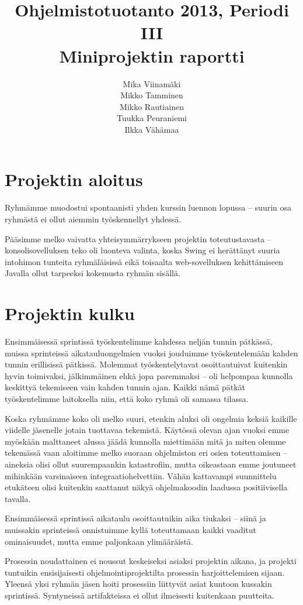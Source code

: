 \documentclass{article}
\title{Ohjelmistotuotanto 2013, Periodi III \\ Miniprojektin raportti}
\author{Mika Viinamäki \\ Mikko Tamminen \\ Mikko Rautiainen \\ Tuukka Peuraniemi \\ Ilkka Vähämaa}
\begin{document}
\begin{titlepage}
\maketitle
\end{titlepage}

\section{Projektin aloitus}
Ryhmämme muodostui spontaanisti yhden kurssin luennon lopussa -- suurin osa ryhmästä ei ollut aiemmin työskennellyt yhdessä.

Pääsimme melko vaivatta yhteisymmärrykseen projektin toteutustavasta -- konsolisovelluksen teko oli luonteva valinta, koska Swing ei herättänyt suuria intohimon tunteita ryhmäläisissä eikä toisaalta web-sovelluksen kehittämiseen Javalla ollut tarpeeksi kokemusta ryhmän sisällä.

\section{Projektin kulku}

Ensimmäisessä sprintissä työskentelimme kahdessa neljän tunnin pätkässä, muissa sprinteissä aikatauluongelmien vuoksi jouduimme työskentelemään kahden tunnin erillisissä pätkissä. Molemmat työskentelytavat osoittautuivat kuitenkin hyvin toimivaksi, jälkimmäinen ehkä jopa paremmaksi -- oli helpompaa kunnolla keskittyä tekemiseen vain kahden tunnin ajan. Kaikki nämä pätkät työskentelimme laitoksella niin, että koko ryhmä oli samassa tilassa.

Koska ryhmämme koko oli melko suuri, etenkin aluksi oli ongelmia keksiä kaikille viidelle jäsenelle jotain tuottavaa tekemistä. Käytössä olevan ajan vuoksi emme myöskään malttaneet alussa jäädä kunnolla miettimään mitä ja miten olemme tekemässä vaan aloitimme melko suoraan ohjelmiston eri osien toteuttamisen -- aineksia olisi ollut suurempaankin katastrofiin, mutta oikeastaan emme joutuneet mihinkään varsinaiseen integraatiohelvettiin. Vähän kattavampi suunnittelu etukäteen olisi kuitenkin saattanut näkyä ohjelmakoodin laadussa positiivisella tavalla.

Ensimmäisessä sprintissä aikataulu osoittautuikin aika tiukaksi -- siinä ja muissakin sprinteissä onnistuimme kyllä toteuttamaan kaikki vaaditut ominaisuudet, mutta emme paljonkaan ylimääräistä.

Prosessin noudattainen ei noussut keskeiseksi asiaksi projektin aikana, ja projekti tuntuikin ensisijaisesti ohjelmointiprojektilta prosessin harjoittelemisen sijaan. Yleensä yksi ryhmän jäsen hoiti prosessiin liittyvät asiat kuntoon kussakin sprintissä. Syntyneissä artifakteissa ei ollut ilmeisesti kuitenkaan puutteita.
\end{document}
